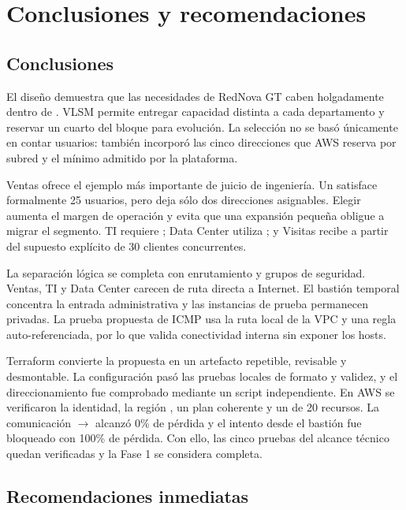 \chapter{Conclusiones y recomendaciones}

\section{Conclusiones}

El diseño demuestra que las necesidades de RedNova GT caben holgadamente dentro de . VLSM permite entregar capacidad distinta a cada departamento y reservar un cuarto del bloque para evolución. La selección no se basó únicamente en contar usuarios: también incorporó las cinco direcciones que AWS reserva por subred y el mínimo  admitido por la plataforma.

Ventas ofrece el ejemplo más importante de juicio de ingeniería. Un  satisface formalmente 25 usuarios, pero deja sólo dos direcciones asignables. Elegir  aumenta el margen de operación y evita que una expansión pequeña obligue a migrar el segmento. TI requiere ; Data Center utiliza ; y Visitas recibe  a partir del supuesto explícito de 30 clientes concurrentes.

La separación lógica se completa con enrutamiento y grupos de seguridad. Ventas, TI y Data Center carecen de ruta directa a Internet. El bastión temporal concentra la entrada administrativa y las instancias de prueba permanecen privadas. La prueba propuesta de ICMP usa la ruta local de la VPC y una regla auto-referenciada, por lo que valida conectividad interna sin exponer los hosts.

Terraform convierte la propuesta en un artefacto repetible, revisable y desmontable. La configuración pasó las pruebas locales de formato y validez, y el direccionamiento fue comprobado mediante un script independiente. En AWS se verificaron la identidad, la región , un plan coherente y un  de 20 recursos. La comunicación  $\rightarrow$  alcanzó 0\% de pérdida y el intento desde el bastión fue bloqueado con 100\% de pérdida. Con ello, las cinco pruebas del alcance técnico quedan verificadas y la Fase 1 se considera completa.

\section{Recomendaciones inmediatas}

